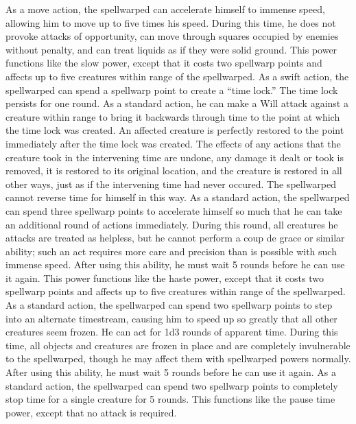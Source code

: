  As a move action, the spellwarped can accelerate himself to immense speed, allowing him to move up to five times his speed. During this time, he does not provoke attacks of opportunity, can move through squares occupied by enemies without penalty, and can treat liquids as if they were solid ground.
 This power functions like the slow power, except that it costs two spellwarp points and affects up to five creatures within \rngclose range of the spellwarped.
 As a swift action, the spellwarped can spend a spellwarp point to create a ``time lock.'' The time lock persists for one round. As a standard action, he can make a Will attack against a creature within \rngmed range to bring it backwards through time to the point at which the time lock was created. An affected creature is perfectly restored to the point immediately after the time lock was created. The effects of any actions that the creature took in the intervening time are undone, any damage it dealt or took is removed, it is restored to its original location, and the creature is restored in all other ways, just as if the intervening time had never occured. The spellwarped cannot reverse time for himself in this way.
 As a standard action, the spellwarped can spend three spellwarp points to accelerate himself so much that he can take an additional round of actions immediately. During this round, all creatures he attacks are treated as helpless, but he cannot perform a coup de grace or similar ability; such an act requires more care and precision than is possible with such immense speed. After using this ability, he must wait 5 rounds before he can use it again.
 This power functions like the haste power, except that it costs two spellwarp points and affects up to five creatures within \rngclose range of the spellwarped.
 As a standard action, the spellwarped can spend two spellwarp points to step into an alternate timestream, causing him to speed up so greatly that all other creatures seem frozen. He can act for 1d3 rounds of apparent time. During this time, all objects and creatures are frozen in place and are completely invulnerable to the spellwarped, though he may affect them with spellwarped powers normally. After using this ability, he must wait 5 rounds before he can use it again.
 As a standard action, the spellwarped can spend two spellwarp points to completely stop time for a single creature for 5 rounds. This functions like the pause time power, except that no attack is required.

